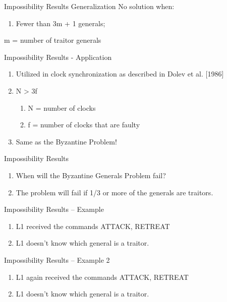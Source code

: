 \documentclass[11pt]{beamer}
\begin{document}
\begin{frame}{Impossibility Results Generalization}
	No solution when:
	\begin{enumerate}
		\item Fewer than {\color{red}3m + 1} generals;
	\end{enumerate}
{\color{red}m} = number of traitor generals
\end{frame}

\begin{frame}{Impossibility Results - Application}
	\begin{enumerate}
		\item Utilized in clock synchronization as described in Dolev et al. [1986] 
		\item N > 3f
		\begin{enumerate}
			\item N = number of clocks
			\item f = number of clocks that are faulty
		\end{enumerate}
		\item Same as the Byzantine Problem!
	\end{enumerate}
\end{frame}

\begin{frame}{Impossibility Results}
	\begin{enumerate}
		\item When will the Byzantine Generals Problem fail?
		\item The problem will fail if 1/3 or more of the generals are traitors.
	\end{enumerate}
\end{frame}

\begin{frame}{Impossibility Results – Example}
	\begin{enumerate}
		\item L1 received the commands ATTACK, RETREAT
		\item L1 doesn’t know which general is a traitor.
	\end{enumerate}
\end{frame}

\begin{frame}{Impossibility Results – Example 2}
	\begin{enumerate}
		\item L1 again received the commands ATTACK, RETREAT
		\item L1 doesn’t know which general is a traitor.
	\end{enumerate}
\end{frame}
\end{document}
